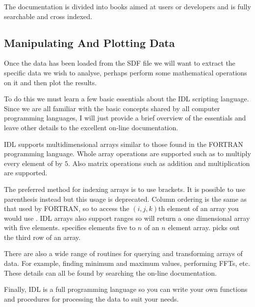  The documentation is divided into books aimed at users or developers and
  is fully searchable and cross indexed.

\subsection{Manipulating And Plotting Data}
  Once the data has been loaded from the SDF file we will want to extract
  the specific data we wish to analyse, perhaps perform some mathematical
  operations on it and then plot the results.

  To do this we must learn a few basic essentials about the IDL scripting
  language. Since we are all familiar with the basic concepts shared by
  all computer programming languages, I will just provide a brief overview
  of the essentials and leave other details to the excellent on-line
  documentation.

  IDL supports multidimensional arrays similar to those found in the
  FORTRAN programming language. Whole array operations are supported
  such as  to multiply every element of  by $5$.
  Also matrix operations such as addition and multiplication are supported.

  The preferred method for indexing arrays is to use brackets. It is
  possible to use parenthesis instead but this usage is deprecated.
  Column ordering is the same as that used by FORTRAN, so to access
  the $(i,j,k)$th element of an array you would use .
  IDL arrays also support ranges so  will return
  a one dimensional array with five elements.  specifies
  elements five to $n$ of an $n$ element array.  picks
  out the third row of an array.

  There are also a wide range of routines for querying and transforming
  arrays of data. For example, finding minimum and maximum values,
  performing FFTs, etc. These details can all be found by searching the
  on-line documentation. 

  Finally, IDL is a full programming language so you can write your own
  functions and procedures for processing the data to suit your needs.

